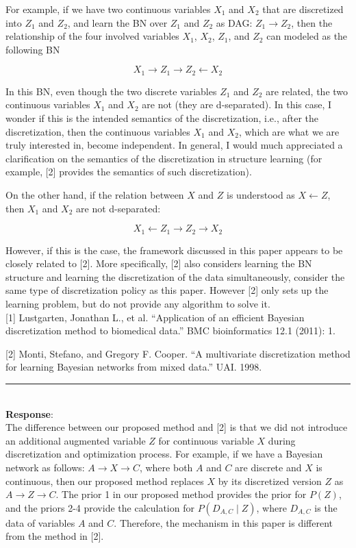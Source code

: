 \documentclass{article}
\begin{document}
For example, if we have two continuous variables $X_1$ and $X_2$ that are discretized into $Z_1$ and $Z_2$, and learn the BN over $Z_1$ and $Z_2$ as DAG: $Z_1 \rightarrow Z_2$, then the relationship of the four involved variables $X_1$, $X_2$, $Z_1$, and $Z_2$ can modeled as the following BN


$$X_1 \rightarrow Z_1 \rightarrow Z_2 \leftarrow X_2$$


In this BN, even though the two discrete variables $Z_1$ and $Z_2$ are related, the two continuous variables $X_1$ and $X_2$ are not (they are d-separated). In this case, I wonder if this is the intended semantics of the discretization, i.e., after the discretization, then the continuous variables $X_1$ and $X_2$, which are what we are truly interested in, become independent. In general, I would much appreciated a clarification on the semantics of the discretization in structure learning (for example, [2] provides the semantics of such discretization).

On the other hand, if the relation between $X$ and $Z$ is understood as $X \leftarrow Z$, then $X_1$ and $X_2$ are not d-separated:

$$X_1 \leftarrow Z_1 \rightarrow Z_2 \rightarrow X_2$$

However, if this is the case, the framework discussed in this paper appears to be closely related to [2]. More specifically, [2] also considers learning the BN structure and learning the discretization of the data simultaneously, consider the same type of discretization policy as this paper. However [2] only sets up the learning problem, but do not provide any algorithm to solve it.\\

[1] Lustgarten, Jonathan L., et al. ``Application of an efficient Bayesian discretization method to biomedical data.'' BMC bioinformatics 12.1 (2011): 1.

[2] Monti, Stefano, and Gregory F. Cooper. ``A multivariate discretization method for learning Bayesian networks from mixed data.'' UAI. 1998.

\noindent\rule{8cm}{0.4pt}\\
{\bf Response}:\\

The difference between our proposed method and [2] is that we did not introduce an additional augmented variable $Z$ for continuous variable $X$ during discretization and optimization process.
For example, if we have a Bayesian network as follows: $A \rightarrow X \rightarrow C$, where both $A$ and $C$ are discrete and $X$ is continuous, then our proposed method replaces $X$ by its discretized version $Z$ as $A \rightarrow Z \rightarrow C$.
The prior 1 in our proposed method provides the prior for $P(Z)$, and the priors 2-4 provide the calculation for $P(D_{A,C} \mid Z)$, where $D_{A,C}$ is the data of variables $A$ and $C$.
Therefore, the mechanism in this paper is different from the method in [2].
\end{document}
